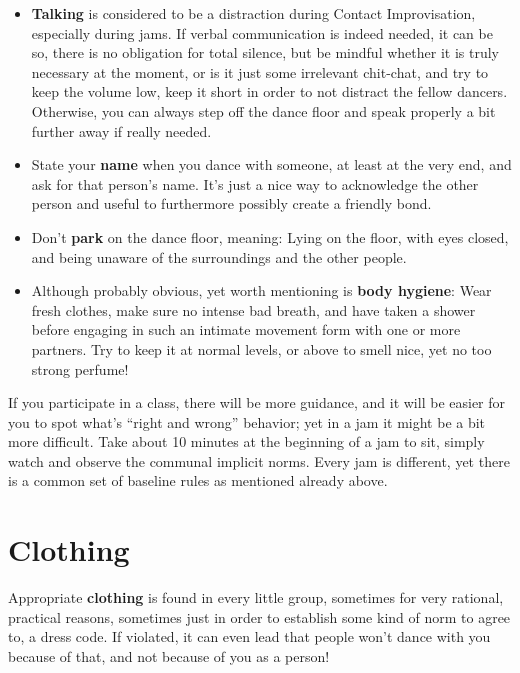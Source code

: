 \begin{itemize}
    \item \textbf{Talking} is considered to be a distraction during Contact Improvisation, especially during jams.
    If verbal communication is indeed needed, it can be so, there is no obligation for total silence, but be mindful whether it is truly necessary at the moment, or is it just some irrelevant chit-chat, and try to keep the volume low, keep it short in order to not distract the fellow dancers.
    Otherwise, you can always step off the dance floor and speak properly a bit further away if really needed.
    \item State your \textbf{name} when you dance with someone, at least at the very end, and ask for that person's name.
    It's just a nice way to acknowledge the other person and useful to furthermore possibly create a friendly bond.
    \item Don't \textbf{park} on the dance floor, meaning: Lying on the floor, with eyes closed, and being unaware of the surroundings and the other people.
    \item Although probably obvious, yet worth mentioning is \textbf{body hygiene}: Wear fresh clothes, make sure no intense bad breath, and have taken a shower before engaging in such an intimate movement form with one or more partners.
    Try to keep it at normal levels, or above to smell nice, yet no too strong perfume!
\end{itemize}

If you participate in a class, there will be more guidance, and it will be easier for you to spot what's ``right and wrong'' behavior; yet in a jam it might be a bit more difficult.
Take about 10 minutes at the beginning of a jam to sit, simply watch and observe the communal implicit norms.
Every jam is different, yet there is a common set of baseline rules as mentioned already above.

\section{Clothing}\label{sec:clothing}

Appropriate \textbf{clothing} is found in every little group, sometimes for very rational, practical reasons, sometimes just in order to establish some kind of norm to agree to, a dress code.
If violated, it can even lead that people won't dance with you because of that, and not because of you as a person!

